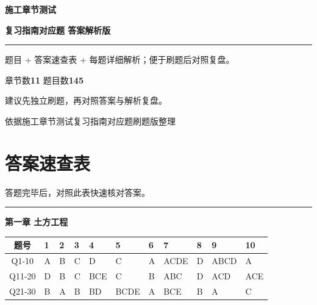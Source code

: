 \documentclass[UTF8,fontset=windows,11pt]{ctexart}
\newcommand{\chaptermeta}[1]{%
  \vspace{-0.25em}
  {\small\textcolor{examgray}{#1}}\par
  \vspace{0.35em}
  {\color{examline}\rule{\linewidth}{0.55pt}}\vspace{0.25em}
}
\begin{document}
\begin{titlepage}
\vspace*{1.2cm}
{\Huge\bfseries\textcolor{examnavy}{施工章节测试}}\par
\vspace{0.35em}
{\LARGE\bfseries\textcolor{examred}{复习指南对应题 答案解析版}}\par
\vspace{0.8em}
{\color{examline}\rule{0.82\linewidth}{0.8pt}}\par
\vspace{1.1em}
{\large 题目 + 答案速查表 + 每题详细解析；便于刷题后对照复盘。}\par
\vspace{2.2em}
\begin{tcolorbox}[
  enhanced,
  width=0.78\linewidth,
  colback=exambg,
  colframe=examline,
  boxrule=0.6pt,
  arc=1mm,
  left=4mm,
  right=4mm,
  top=3mm,
  bottom=3mm
]
\Large
\textcolor{examnavy}{章节数}\quad\textbf{11}\qquad
\textcolor{examnavy}{题目数}\quad\textbf{145}\par
\vspace{0.45em}
\normalsize\textcolor{examgray}{建议先独立刷题，再对照答案与解析复盘。}
\end{tcolorbox}
\vfill
{\small\textcolor{examgray}{依据施工章节测试复习指南对应题刷题版整理}}
\end{titlepage}
\tableofcontents
\newpage


\section{答案速查表}

\chaptermeta{答题完毕后，对照此表快速核对答案。}

\noindent\textbf{\textcolor{examnavy}{第一章  土方工程}}\\\vspace{0.3em}

\begin{tabularx}{\linewidth}{|c|X|X|X|X|X|X|X|X|X|X|}
\hline
\textbf{题号} & \textbf{1} & \textbf{2} & \textbf{3} & \textbf{4} & \textbf{5} & \textbf{6} & \textbf{7} & \textbf{8} & \textbf{9} & \textbf{10} \\
\hline
Q1-10 & A & B & C & D & C & A & ACDE & D & ABCD & A \\
\hline
Q11-20 & D & B & C & BCE & C & B & ABC & D & ACD & ACE \\
\hline
Q21-30 & B & A & B & BD & BCDE & A & BCE & B & A & C \\
\hline
\end{tabularx}
\vspace{0.6em}
\end{document}

